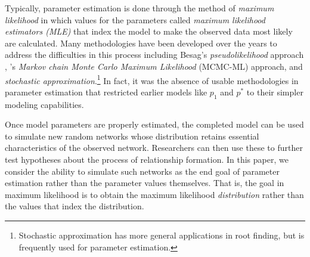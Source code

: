 Typically, parameter estimation is done through the method of 
\emph{maximum likelihood} in which values for the parameters called \emph{maximum 
likelihood estimators (MLE)} that index the model to make the observed data most likely 
are calculated.
Many methodologies have been developed over the years to address the difficulties
in this process
including Besag's \emph{pseudolikelihood} approach \citep{Besag:1974,Strauss:1990}, 
\citeauthor{Geyer:1992}'s \citeyearpar{Geyer:1992}
\emph{Markov chain Monte Carlo Maximum Likelihood} (MCMC-ML) approach, and 
\emph{stochastic approximation}.\footnote{Stochastic approximation has more general
applications in root finding, but is frequently used for parameter estimation.}
In fact, it was the absence of usable methodologies in parameter estimation that 
restricted earlier models like $p_1$ and $p^*$ to their simpler modeling capabilities.


Once model parameters are properly estimated, the completed model can be used to simulate 
new random networks whose distribution retains essential characteristics of 
the observed network.  Researchers can then use these 
to further test hypotheses about the process of relationship formation.  
In this paper, we consider the ability to simulate such networks as the end goal of parameter
estimation rather than the parameter values themselves.  That is, the goal in 
maximum likelihood is to obtain the maximum likelihood \emph{distribution} 
rather than the values that index the distribution.


%

